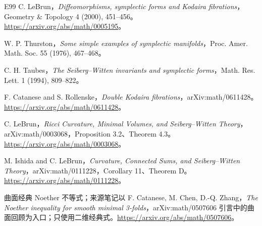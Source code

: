 \documentclass[UTF8,11pt,openany,fontset=none]{ctexbook}
\theoremstyle{definition}
\theoremstyle{remark}
\begin{document}
\begin{thebibliography}{E99}
 C. LeBrun，\emph{Diffeomorphisms, symplectic forms and Kodaira fibrations}，Geometry \& Topology 4 (2000), 451--456。\url{https://arxiv.org/abs/math/0005195}。

 W. P. Thurston，\emph{Some simple examples of symplectic manifolds}，Proc. Amer. Math. Soc. 55 (1976), 467--468。

 C. H. Taubes，\emph{The Seiberg--Witten invariants and symplectic forms}，Math. Res. Lett. 1 (1994), 809--822。

 F. Catanese and S. Rollenske，\emph{Double Kodaira fibrations}，arXiv:math/0611428。\url{https://arxiv.org/abs/math/0611428}。

 C. LeBrun，\emph{Ricci Curvature, Minimal Volumes, and Seiberg--Witten Theory}，arXiv:math/0003068，Proposition 3.2、Theorem 4.3。\url{https://arxiv.org/abs/math/0003068}。

 M. Ishida and C. LeBrun，\emph{Curvature, Connected Sums, and Seiberg--Witten Theory}，arXiv:math/0111228，Corollary 11、Theorem D。\url{https://arxiv.org/abs/math/0111228}。

 曲面经典 Noether 不等式；来源笔记以 F. Catanese, M. Chen, D.-Q. Zhang，\emph{The Noether inequality for smooth minimal 3-folds}，arXiv:math/0507606 引言中的曲面回顾为入口；只使用二维经典式。\url{https://arxiv.org/abs/math/0507606}。

\end{thebibliography}
\end{document}
